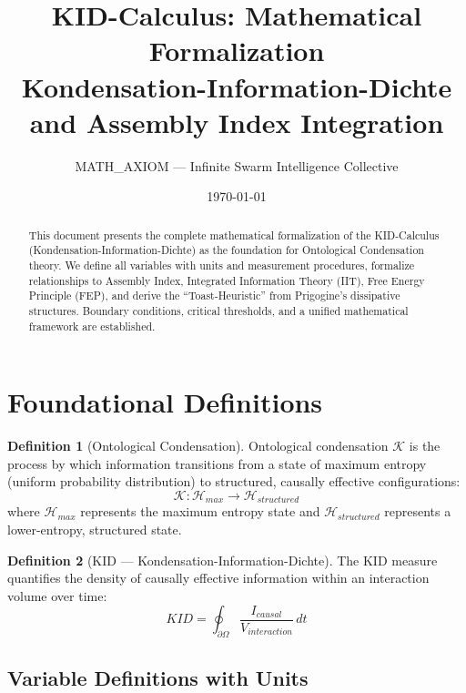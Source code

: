 \documentclass[11pt,a4paper]{article}
\title{\textbf{KID-Calculus: Mathematical Formalization}\\\large Kondensation-Information-Dichte and Assembly Index Integration}
\author{MATH_AXIOM --- Infinite Swarm Intelligence Collective}
\date{\today}
\theoremstyle{definition}
\newtheorem{definition}{Definition}[section]
\begin{document}
\maketitle

\begin{abstract}
This document presents the complete mathematical formalization of the KID-Calculus (Kondensation-Information-Dichte) as the foundation for Ontological Condensation theory. We define all variables with units and measurement procedures, formalize relationships to Assembly Index, Integrated Information Theory (IIT), Free Energy Principle (FEP), and derive the ``Toast-Heuristic'' from Prigogine's dissipative structures. Boundary conditions, critical thresholds, and a unified mathematical framework are established.
\end{abstract}

\tableofcontents
\newpage

\section{Foundational Definitions}

\begin{definition}[Ontological Condensation]
Ontological condensation $\mathcal{K}$ is the process by which information transitions from a state of maximum entropy (uniform probability distribution) to structured, causally effective configurations:
\begin{equation}
\mathcal{K}: \mathcal{H}_{max} \rightarrow \mathcal{H}_{structured}
\end{equation}
where $\mathcal{H}_{max}$ represents the maximum entropy state and $\mathcal{H}_{structured}$ represents a lower-entropy, structured state.
\end{definition}

\begin{definition}[KID --- Kondensation-Information-Dichte]
The KID measure quantifies the density of causally effective information within an interaction volume over time:
\begin{equation}
KID = \oint_{\partial\Omega} \frac{I_{causal}}{V_{interaction}} \, dt
\end{equation}
\end{definition}

\subsection{Variable Definitions with Units}
\end{document}
